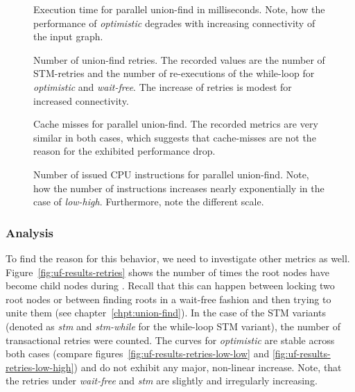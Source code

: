 \begin{figure}
  \centering
  \caption[Execution time for parallel union-find in milliseconds.]{Execution
    time for parallel union-find in milliseconds. Note, how the performance of
    \emph{optimistic} degrades with increasing connectivity of the input graph.}
  \label{fig:uf-results-ms}
\end{figure}

\begin{figure}
  \centering
  \caption[Number of union-find retries.]{Number of union-find retries. The
    recorded values are the number of STM-retries and the number of
    re-executions of the while-loop for \emph{optimistic} and
    \emph{wait-free}. The increase of retries is modest for increased
    connectivity.}
  \label{fig:uf-results-retries}

  \caption[Cache misses for parallel union-find.]{Cache misses for parallel
    union-find. The recorded metrics are very similar in both cases, which
    suggests that cache-misses are not the reason for the exhibited performance
    drop.}
  \label{fig:uf-results-cache-misses}

  \caption[Number of issued CPU instructions for parallel union-find.]{Number of
    issued CPU instructions for parallel union-find. Note, how the number of
    instructions increases nearly exponentially in the case of
    \emph{low-high}. Furthermore, note the different scale.}
  \label{fig:uf-results-instructions}
\end{figure}

\subsubsection{Analysis}

To find the reason for this behavior, we need to investigate other metrics as
well. Figure~\ref{fig:uf-results-retries} shows the number of times the root
nodes have become child nodes during . Recall that this can
happen between locking two root nodes or between finding roots in a wait-free
fashion and then trying to unite them (see chapter~\ref{chpt:union-find}). In
the case of the STM variants (denoted as \emph{stm} and \emph{stm-while} for the
while-loop STM variant), the number of transactional retries were counted. The
curves for \emph{optimistic} are stable across both cases (compare
figures~\ref{fig:uf-results-retries-low-low} and
\ref{fig:uf-results-retries-low-high}) and do not exhibit any major, non-linear
increase. Note, that the retries under \emph{wait-free} and \emph{stm} are
slightly and irregularly increasing.


